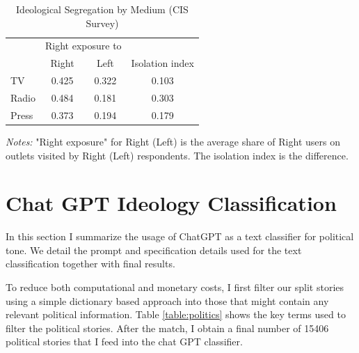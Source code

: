 \documentclass[12pt]{article}
\begin{document}

\begin{table}[htbp]
	\centering
	\caption{Ideological Segregation by Medium (CIS Survey)}

	\begin{tabular}{lccc}
		\hline
		& \multicolumn{2}{c}{Right exposure to } & \\
		\cline{2-3}
		& Right & Left & Isolation index \\
		\hline
		TV    & 0.425 & 0.322 & 0.103 \\
		Radio & 0.484 & 0.181 & 0.303 \\
		Press & 0.373 & 0.194 & 0.179 \\
		\hline
	\end{tabular}
	\begin{tablenotes}
		\small
		\item \textit{Notes:} "Right exposure" for Right (Left) is the average share of Right users on outlets visited by Right (Left) respondents. The isolation index is the difference.
	\end{tablenotes}
		\label{tab:isolation_table}
\end{table}
	

\section{Chat GPT Ideology Classification}\label{sec:chat_gpt}
	
	In this section I summarize the usage of ChatGPT as a text classifier for political tone. We detail the prompt and specification details used for the text classification together with final results. 
	
	
	
	
	To reduce both computational and monetary costs, I first filter our split stories using a simple dictionary based approach into those that might contain any relevant political information. Table \ref{table:politics} shows the key terms used to filter the political stories. After the match, I obtain a final number of 15406 political stories that I feed into the chat GPT classifier.
	
	\clearpage
	
\end{document}
